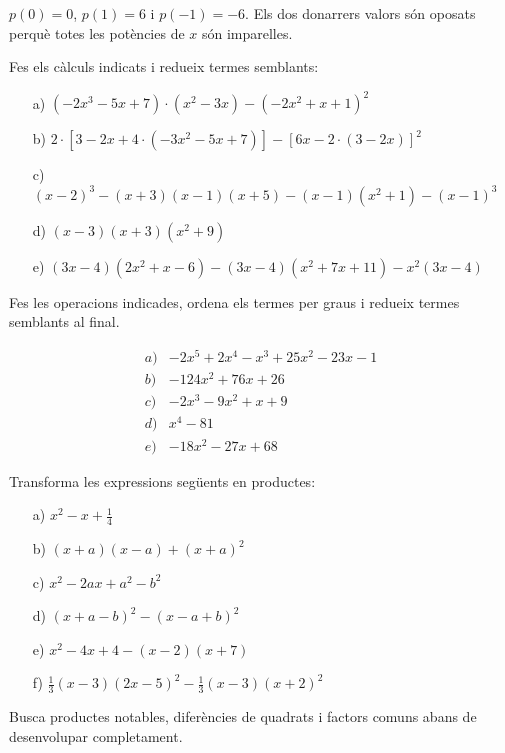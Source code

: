 \begin{solucio}
$p(0)=0$, $p(1)=6$ i $p(-1)=-6$. Els dos donarrers valors són oposats perquè totes les potències de $x$ són imparelles.
\end{solucio}

\begin{exercici}
Fes els càlculs indicats i redueix termes
semblants:

\begin{enumerate}
\item[a)] $(-2x^{3}-5x+7)\cdot (x^{2}-3x)-(-2x^{2}+x+1)^{2}$

\item[b)] $2\cdot \left[ 3-2x+4\cdot (-3x^{2}-5x+7)\right] -\left[ 6x-2\cdot
(3-2x)\right] ^{2}$

\item[c)] $(x-2)^{3}-(x+3)(x-1)(x+5)-(x-1)(x^{2}+1)-(x-1)^{3}$

\item[d)] $(x-3)(x+3)(x^{2}+9)$

\item[e)] $(3x-4)(2x^{2}+x-6)-(3x-4)(x^{2}+7x+11)-x^{2}(3x-4)$
\end{enumerate}
\end{exercici}
\begin{indicacio}
Fes les operacions indicades, ordena els termes per graus i redueix termes semblants al final.
\end{indicacio}

\begin{solucio}
\[
\begin{array}{ll}
a) & -2x^{5}+2x^{4}-x^{3}+25x^{2}-23x-1 \\
b) & -124x^{2}+76x+26 \\
c) & -2x^{3}-9x^{2}+x+9 \\
d) & x^{4}-81 \\
e) & -18x^{2}-27x+68
\end{array}
\]
\end{solucio}

\begin{exercici}
Transforma les expressions següents en productes:

\begin{enumerate}
\item[a)] $x^{2}-x+\frac{1}{4}$

\item[b)] $(x+a)(x-a)+(x+a)^{2}$

\item[c)] $x^{2}-2ax+a^{2}-b^{2}$

\item[d)] $(x+a-b)^{2}-(x-a+b)^{2}$

\item[e)] $x^{2}-4x+4-(x-2)(x+7)$

\item[f)] $\frac{1}{3}(x-3)(2x-5)^{2}-\frac{1}{3}(x-3)(x+2)^{2}$
\end{enumerate}
\end{exercici}
\begin{indicacio}
Busca productes notables, diferències de quadrats i factors comuns abans de desenvolupar completament.
\end{indicacio}

